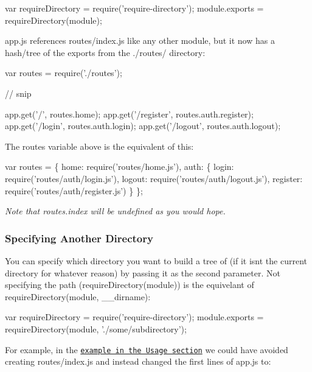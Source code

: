 \begin{DoxyCode}
var requireDirectory = require('require-directory');
module.exports = requireDirectory(module);
\end{DoxyCode}


{\ttfamily app.\+js} references {\ttfamily routes/index.\+js} like any other module, but it now has a hash/tree of the exports from the {\ttfamily ./routes/} directory\+:


\begin{DoxyCode}
var routes = require('./routes');

// snip

app.get('/', routes.home);
app.get('/register', routes.auth.register);
app.get('/login', routes.auth.login);
app.get('/logout', routes.auth.logout);
\end{DoxyCode}


The {\ttfamily routes} variable above is the equivalent of this\+:


\begin{DoxyCode}
var routes = \{
  home: require('routes/home.js'),
  auth: \{
    login: require('routes/auth/login.js'),
    logout: require('routes/auth/logout.js'),
    register: require('routes/auth/register.js')
  \}
\};
\end{DoxyCode}


{\itshape Note that {\ttfamily routes.\+index} will be {\ttfamily undefined} as you would hope.}

\subsubsection*{Specifying Another Directory}

You can specify which directory you want to build a tree of (if it isn\textquotesingle{}t the current directory for whatever reason) by passing it as the second parameter. Not specifying the path ({\ttfamily require\+Directory(module)}) is the equivelant of {\ttfamily require\+Directory(module, \+\_\+\+\_\+dirname)}\+:


\begin{DoxyCode}
var requireDirectory = require('require-directory');
module.exports = requireDirectory(module, './some/subdirectory');
\end{DoxyCode}


For example, in the \href{#usage}{\tt example in the Usage section} we could have avoided creating {\ttfamily routes/index.\+js} and instead changed the first lines of {\ttfamily app.\+js} to\+:


